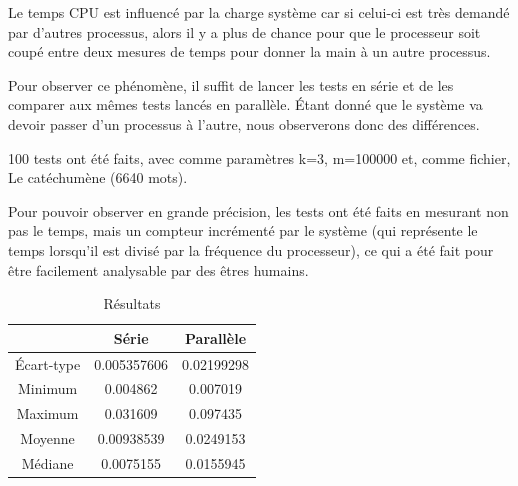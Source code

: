 Le temps CPU est influencé par la charge système car si celui-ci est très demandé par d'autres processus, alors il y a plus de chance pour que le processeur soit coupé entre deux mesures de temps pour donner la main à un autre processus.

Pour observer ce phénomène, il suffit de lancer les tests en série et de les comparer aux mêmes tests lancés en parallèle.
Étant donné que le système va devoir passer d'un processus à l'autre, nous observerons donc des différences.

100 tests ont été faits, avec comme paramètres k=3, m=100000 et, comme fichier, Le catéchumène (6640 mots).

Pour pouvoir observer en grande précision, les tests ont été faits en mesurant non pas le temps, mais un compteur incrémenté par le système (qui représente le temps lorsqu'il est divisé par la fréquence du processeur), ce qui a été fait pour être facilement analysable par des êtres humains.

\begin{table}[H]
	\centering
	\caption{Résultats}
	\label{tab:resultatTemps}
	\begin{tabular}{c|cc}
		\toprule
		& Série & Parallèle\\
		\midrule
		Écart-type & 0.005357606 & 0.02199298\\
		Minimum & 0.004862 & 0.007019\\
		Maximum & 0.031609 & 0.097435\\
		Moyenne & 0.00938539 & 0.0249153\\
		Médiane & 0.0075155 & 0.0155945\\
		\bottomrule
	\end{tabular}
\end{table}

